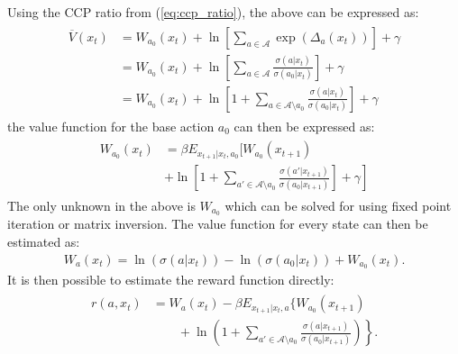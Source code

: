 \documentclass{article}
\begin{document}
\begin{appendix}
Using the CCP ratio from (\ref{eq:ccp_ratio}), the above can be expressed as:
\begin{align} 
\begin{split}
\overline{V}(x_t) &=W_{a_0}(x_t)+\ln\left[\sum_{a\in\mathcal{A}} \exp(\Delta_a(x_t))\right]+\gamma\\
&=W_{a_0}(x_t)+\ln\left[\sum_{a\in\mathcal{A}} \frac{\sigma(a|x_t)}{\sigma(a_0|x_t)}\right]+\gamma\\
&=W_{a_0}(x_t)+\ln\left[1+\sum_{a\in\mathcal{A}\setminus a_0} \frac{\sigma(a|x_t)}{\sigma(a_0|x_t)}\right]+\gamma
\end{split}
\end{align}
the value function for the base action $a_0$ can then be expressed as:
\begin{align}
\begin{split}
W_{a_0}(x_t)&=
 \beta E_{x_{t+1}|x_t,a_0}
\Bigg[W_{a_0}(x_{t+1}) \\
&\left. +\ln\left[1+ \sum_{a'\in\mathcal{A}\setminus a_0}\frac{\sigma(a'|x_{t+1})}{\sigma(a_0|x_{t+1})}\right]+\gamma\right]
\end{split}
\end{align}
The only unknown in the above is $W_{a_0}$ which can be solved for using fixed point iteration or matrix inversion. The value function for every state can then be estimated as:
\begin{eqnarray}
W_a(x_t)=\ln(\sigma(a|x_t))-\ln(\sigma(a_0|x_t))+W_{a_0}(x_t).\label{eq:v_backout}
\end{eqnarray}
It is then possible to estimate the reward function directly:
\begin{align}
\begin{split}
r(a,x_t)
&=W_a(x_t)- \beta E_{x_{t+1}|x_t,a}\Bigg\{
W_{a_0}(x_{t+1})
\\ &\left.\qquad +
\ln
  \left(
    1 + \sum_{a'\in\mathcal{A}\setminus a_0}\frac{\sigma(a|x_{t+1})}{\sigma(a_0|x_{t+1})}
  \right)
\right\}.
\end{split}
\end{align}



\end{appendix}
\end{document}
